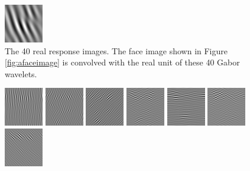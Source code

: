 \begin{figure}
\begin{center}
  \includegraphics[scale=0.5]{ch4/figures/real_3_7.jpg}
 \end{center}
\caption{The 40 real response images. The face image shown in \mbox{Figure} \ref{fig:afaceimage} is convolved with the real unit of these 40 Gabor wavelets.}
\label{fig:realresponses}
\end{figure} 

\begin{figure}
 \begin{center}
  \includegraphics[scale=0.5]{ch4/figures/imag_-1_0.jpg}
  \includegraphics[scale=0.5]{ch4/figures/imag_-1_1.jpg}
  \includegraphics[scale=0.5]{ch4/figures/imag_-1_2.jpg}
  \includegraphics[scale=0.5]{ch4/figures/imag_-1_3.jpg}
  \includegraphics[scale=0.5]{ch4/figures/imag_-1_4.jpg}
  \includegraphics[scale=0.5]{ch4/figures/imag_-1_5.jpg}
  \includegraphics[scale=0.5]{ch4/figures/imag_-1_6.jpg}

\end{center}
\end{figure}
